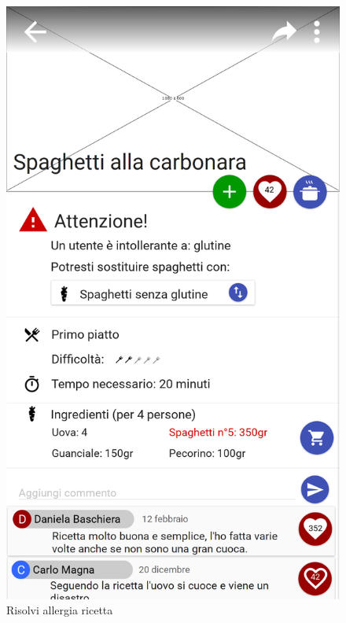 \begin{figure}[H]
\begin{minipage}{.49\textwidth}
		\includegraphics[width=\textwidth]{img/wireframe/presentazione_ricetta_allergia_cambio_ingrediente_aggiungi_ricetta.png}
		\caption{Risolvi allergia ricetta}
		\label{fig:risolvi_allergia}
	\end{minipage}
\end{figure}	
